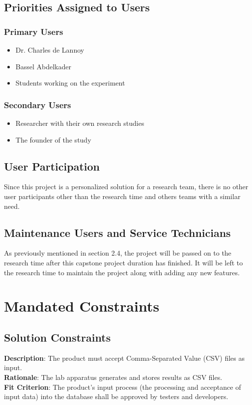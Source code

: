 \documentclass[12pt]{article}
\begin{document}
\subsection{Priorities Assigned to Users}
\subsubsection{Primary Users}
\begin{itemize}
  \item Dr. Charles de Lannoy
  \item Bassel Abdelkader
  \item Students working on the experiment 
\end{itemize}

\subsubsection{Secondary Users}
\begin{itemize}
  \item Researcher with their own research studies 
  \item The founder of the study
\end{itemize}
\subsection{User Participation}
Since this project is a personalized solution for a research team, there is no
other user participants other than the research time and others teams with a
similar need. 
\subsection{Maintenance Users and Service Technicians}
As previously mentioned in section 2.4, the project will be passed on to the
research time after this capstone project duration has finished. It will be left
to the research time to maintain the project along with adding any new features.

\section{Mandated Constraints}
\subsection{Solution Constraints}
\textbf{Description}: The product must accept Comma-Separated Value (CSV) files
as input.\\
\textbf{Rationale}: The lab apparatus generates and stores results as CSV
files.\\
\textbf{Fit Criterion}: The product's input process (the processing and
acceptance of input data) into the database shall be approved by testers and
developers.
\end{document}
